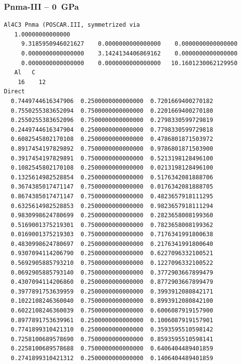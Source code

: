 \subsubsection*{Pnma-III -- 0~GPa}
\begin{footnotesize}
\begin{verbatim}
Al4C3 Pnma (POSCAR.III, symmetrized via 
   1.00000000000000     
     9.3185950946021627    0.0000000000000000    0.0000000000000000
     0.0000000000000000    3.1424134406869162    0.0000000000000000
     0.0000000000000000    0.0000000000000000   10.1601230062129950
   Al   C 
    16    12
Direct
  0.7449744616347906  0.2500000000000000  0.7201669400270182
  0.7550255383652094  0.7500000000000000  0.2201669400270180
  0.2550255383652096  0.7500000000000000  0.2798330599729819
  0.2449744616347904  0.2500000000000000  0.7798330599729818
  0.6082545802170108  0.2500000000000000  0.4786801871503972
  0.8917454197829892  0.7500000000000000  0.9786801871503900
  0.3917454197829891  0.7500000000000000  0.5213198128496100
  0.1082545802170108  0.2500000000000000  0.0213198128496100
  0.1325614982528854  0.2500000000000000  0.5176342081888706
  0.3674385017471147  0.7500000000000000  0.0176342081888705
  0.8674385017471147  0.7500000000000000  0.4823657918111295
  0.6325614982528853  0.2500000000000000  0.9823657918111294
  0.9830998624780699  0.2500000000000000  0.2823658008199360
  0.5169001375219301  0.7500000000000000  0.7823658008199362
  0.0169001375219303  0.7500000000000000  0.7176341991800638
  0.4830998624780697  0.2500000000000000  0.2176341991800640
  0.9307094114206790  0.2500000000000000  0.6227096332100521
  0.5692905885793210  0.7500000000000000  0.1227096332100522
  0.0692905885793140  0.7500000000000000  0.3772903667899479
  0.4307094114206860  0.2500000000000000  0.8772903667899479
  0.3977891753639959  0.2500000000000000  0.3993912080842171
  0.1022108246360040  0.7500000000000000  0.8993912080842100
  0.6022108246360039  0.7500000000000000  0.6006087919157900
  0.8977891753639961  0.2500000000000000  0.1006087919157901
  0.7741899310421310  0.2500000000000000  0.3593595510598142
  0.7258100689578690  0.7500000000000000  0.8593595510598141
  0.2258100689578688  0.7500000000000000  0.6406404489401859
  0.2741899310421312  0.2500000000000000  0.1406404489401859
 

\end{verbatim}
\end{footnotesize}
